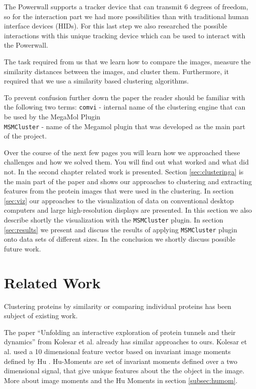 \documentclass[journal]{vgtc}       %
\begin{document}
The Powerwall supports a tracker device that can transmit 6 degrees of freedom, so for the interaction part we had more possibilities than with traditional human interface  devices  (HIDs). For this last step we also researched the possible interactions with this unique tracking device  which can be used to interact with the Powerwall.

The task required from us that we learn how to compare the images, measure the similarity  distances between the images, and cluster them. Furthermore, it  required that we use a similarity based clustering algorithms.


To prevent confusion further down the paper  the reader should be familiar with the following two terms: \verb|comvi| - internal name of the clustering engine that can be used by the MegaMol Plugin \\
\verb|MSMCluster| - name of the Megamol plugin that was developed as the main part of the project.

Over the course of the next few pages you will learn how we approached these challenges and how we  solved them. You will find out what  worked and what did not. In the second chapter related work is presented. Section \ref{sec:clusteringa} is the main part of the paper and shows our approaches to clustering and extracting features from the protein images that were used in the clustering. In section \ref{sec:viz} our approaches to the visualization of data on conventional desktop computers and large high-resolution displays are presented. In this section we also describe shortly  the visualization with the \verb|MSMCluster| plugin. In section \ref{sec:results} we present and discuss the results of applying \verb|MSMCluster| plugin onto data sets of different sizes. In the  conclusion we shortly discuss possible future work.


\section{Related Work}\label{sec:relatedWork}

Clustering proteins by similarity or comparing individual proteins has been subject of existing work.

The paper ``Unfolding an interactive exploration of protein tunnels and their dynamics'' \cite{kolesar} from Kolesar et al.  already has  similar approaches to ours. Kolesar et al. used a 10 dimensional feature vector based on invariant image moments defined by Hu \cite{humoments}. Hu-Moments are set of invariant moments defined over a two dimensional signal, that give unique features about the the object in the image. More about image moments and the Hu Moments in section \ref{subsec:humom}.
\end{document}
